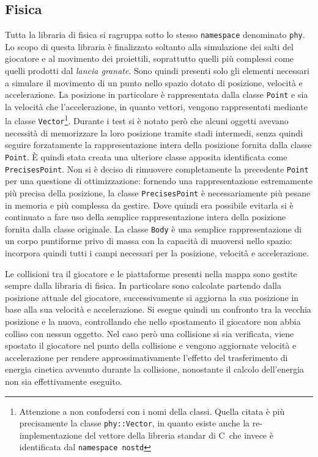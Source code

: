 \documentclass[a4paper]{article}
\def\CC{{C\nolinebreak[4]\hspace{-.05em}\raisebox{.4ex}{\tiny\bf ++}}}
\begin{document}
\subsection{Fisica}
Tutta la libraria di fisica si ragruppa sotto lo stesso \texttt{namespace} 
denominato \texttt{phy}. Lo scopo di questa libraria è finalizzato soltanto alla
simulazione dei salti del giocatore e al movimento dei proiettili, soprattutto
quelli più complessi come quelli prodotti dal \textit{lancia granate}. Sono
quindi presenti solo gli elementi necessari a simulare il movimento di un punto
nello spazio dotato di posizione, velocità e accelerazione. La posizione in 
particolare è rappresentata dalla classe \texttt{Point} e sia la velocità che 
l'accelerazione, in quanto vettori, vengono rappresentati mediante la classe
\texttt{Vector}\footnote{Attenzione a non confodersi con i nomi della classi. 
Quella citata è più precisamente la classe \texttt{phy::Vector}, in quanto 
esiste anche la re-implementazione del vettore della libreria standar di \CC\ 
che invece è identificata dal \texttt{namespace nostd}}. Durante i test si è 
notato però che alcuni oggetti avevano necessità di memorizzare la loro 
posizione tramite stadi intermedi, senza quindi seguire forzatamente la 
rappresentazione intera della posizione fornita dalla classe \texttt{Point}. È 
quindi stata creata una ulteriore classe apposita identificata come 
\texttt{PrecisesPoint}. Non si è deciso di rimuovere completamente la precedente 
\texttt{Point} per una questione di ottimizzazione: fornendo una 
rappresentazione estremamente più precisa della posizione, la classe 
\texttt{PrecisesPoint} è necessariamente più pesane in memoria e più complessa 
da gestire. Dove quindi era possibile evitarla si è continuato a fare uso della 
semplice rappresentazione intera della posizione fornita dalla classe originale.
La classe \texttt{Body} è una semplice rappresentazione di un corpo puntiforme 
privo di massa con la capacità di muoversi nello spazio: incorpora quindi tutti 
i campi necessari per la posizione, velocità e accelerazione.

Le collisioni tra il giocatore e le piattaforme presenti nella mappa sono 
gestite sempre dalla libraria di fisica. In particolare sono calcolate partendo 
dalla posizione attuale del giocatore, successivamente si aggiorna la sua 
posizione in base alla sua velocità e accelerazione. Si esegue quindi un 
confronto tra la vecchia posizione e la nuova, controllando che nello 
spostamento il giocatore non abbia colliso con nessun oggetto. Nel caso però una
collisione si sia verificata, viene spostato il giocatore nel punto della 
collisione e vengono aggiornate velocità e accelerazione per rendere 
approssimativamente l'effetto del trasferimento di energia cinetica avvenuto 
durante la collisione, nonostante il calcolo dell'energia non sia effettivamente
eseguito.
\end{document}

